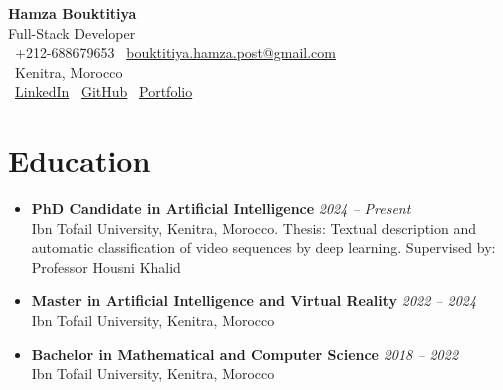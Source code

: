 \documentclass[10pt,a4paper]{article}
\newcommand{\cvheader}[4]{
    \begin{center}
        {\Huge\bfseries #1}\\[0.1em]
        {\large #2}\\[0.1em]
        \faPhone\ #3 \quad \faEnvelope\ \href{mailto:#4}{#4}\\[0.1em]
        \faMapMarker\ Kenitra, Morocco\\[0.1em]
        \faLinkedin\ \href{https://www.linkedin.com/in/hamza-bouktitiya-604471253/}{LinkedIn} \quad
        \faGithub\ \href{https://github.com/gothamza}{GitHub} \quad
        \faGlobe\ \href{https://gothamza.github.io/portfolio/}{Portfolio}
    \end{center}
    \vspace{-0.3em}
}
\newcommand{\cvitem}[2]{\textbf{#1} \hfill \textit{#2}}
\begin{document}
\cvheader{Hamza Bouktitiya}{Full-Stack Developer}{+212-688679653}{bouktitiya.hamza.post@gmail.com}

\section*{Education}
\begin{itemize}
    \item \cvitem{PhD Candidate in Artificial Intelligence}{2024 -- Present}\\
    Ibn Tofail University, Kenitra, Morocco. Thesis: Textual description and automatic classification of video sequences by deep learning. Supervised by: Professor Housni Khalid
    \item \cvitem{Master in Artificial Intelligence and Virtual Reality}{2022 -- 2024}\\
    Ibn Tofail University, Kenitra, Morocco
    \item \cvitem{Bachelor in Mathematical and Computer Science}{2018 -- 2022}\\
    Ibn Tofail University, Kenitra, Morocco
\end{itemize}
\end{document}
